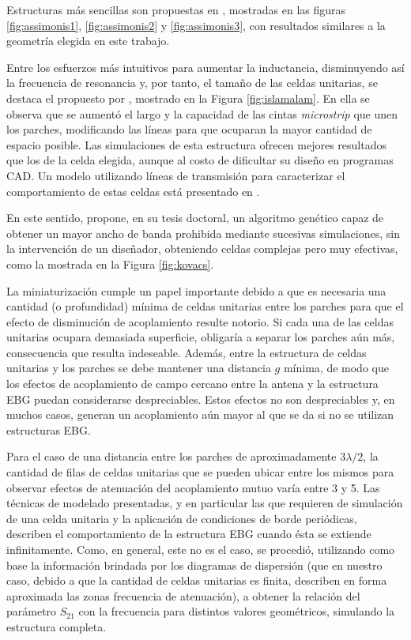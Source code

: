 Estructuras más sencillas son propuestas en \cite{Asimonis:designoptimization}, mostradas en las figuras \ref{fig:assimonis1}, \ref{fig:assimonis2} y \ref{fig:assimonis3}, con resultados similares a la geometría elegida en este trabajo.

Entre los esfuerzos más intuitivos para aumentar la inductancia, disminuyendo así la frecuencia de resonancia y, por tanto, el tamaño de las celdas unitarias, se destaca el propuesto por \cite{IslamAlam:CompactEBG}, mostrado en la Figura \ref{fig:islamalam}. En ella se observa que se aumentó el largo y la capacidad de las cintas \textit{microstrip} que unen los parches, modificando las líneas para que ocuparan la mayor cantidad de espacio posible. Las simulaciones de esta estructura ofrecen mejores resultados que los de la celda elegida, aunque al costo de dificultar su diseño en programas \textsc{CAD}. Un modelo utilizando líneas de transmisión para caracterizar el comportamiento de estas celdas está presentado en \cite{Venkateswaran:Thesis}. 

En este sentido, \cite{Kovacs:DesignOptimization} propone, en su tesis doctoral, un algoritmo genético capaz de obtener un mayor ancho de banda prohibida mediante sucesivas simulaciones, sin la intervención de un diseñador, obteniendo celdas complejas pero muy efectivas, como la mostrada en la Figura \ref{fig:kovacs}.

La miniaturización cumple un papel importante debido a que es necesaria una cantidad (o profundidad) mínima de celdas unitarias entre los parches para que el efecto de disminución de acoplamiento resulte notorio. Si cada una de las celdas unitarias ocupara demasiada superficie, obligaría a separar los parches aún más, consecuencia que resulta indeseable. Además, entre la estructura de celdas unitarias y los parches se debe mantener una distancia $g$ mínima, de modo que los efectos de acoplamiento de campo cercano entre la antena y la estructura EBG puedan considerarse despreciables. Estos efectos no son despreciables y, en muchos casos, generan un acoplamiento aún mayor al que se da si no se utilizan estructuras EBG.

Para el caso de una distancia entre los parches de aproximadamente $3\lambda/2$, la cantidad de filas de celdas unitarias que se pueden ubicar entre los mismos para observar efectos de atenuación del acoplamiento mutuo varía entre 3 y 5. Las técnicas de modelado presentadas, y en particular las que requieren de simulación de una celda unitaria y la aplicación de condiciones de borde periódicas, describen el comportamiento de la estructura EBG cuando ésta se extiende infinitamente. Como, en general, este no es el caso, se procedió, utilizando como base la información brindada por los diagramas de dispersión (que en nuestro caso, debido a que la cantidad de celdas unitarias es finita, describen en forma aproximada las zonas frecuencia de atenuación), a obtener la relación del parámetro $S_{21}$ con la frecuencia para distintos valores geométricos, simulando la estructura completa.

